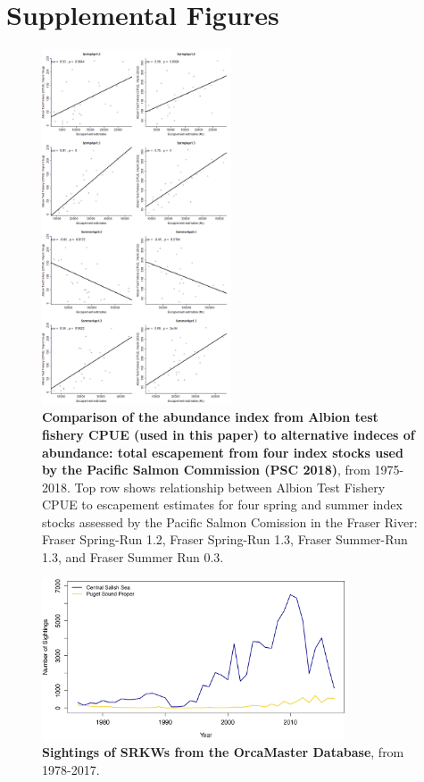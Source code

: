 \documentclass{article}
\begin{document}
\section* {Supplemental Figures}
\begin{figure}[p]
\includegraphics[width=0.5\textwidth]{../analyses/orcaphen/figures/ctcalbion.png}
\caption{\textbf{Comparison of the abundance index from Albion test fishery CPUE (used in this paper) to alternative indeces of abundance: total escapement from four index stocks used by the Pacific Salmon Commission (PSC 2018)}, from 1975-2018. Top row shows relationship between Albion Test Fishery CPUE to escapement estimates for four spring and summer index stocks assessed by the Pacific Salmon Comission in the Fraser River: Fraser Spring-Run 1.2, Fraser Spring-Run 1.3, Fraser Summer-Run 1.3, and Fraser Summer Run 0.3.}
\label{fig:ctcalb}
\end{figure}

\begin{figure}[p]
\includegraphics[width=0.8\textwidth]{../analyses/figures/OrcaPhenPlots/numsights_1976_2regs.png} 
\caption{\textbf{Sightings of SRKWs from the OrcaMaster Database}, from 1978-2017. }
\label{fig:sights}
\end{figure}
\end{document}
